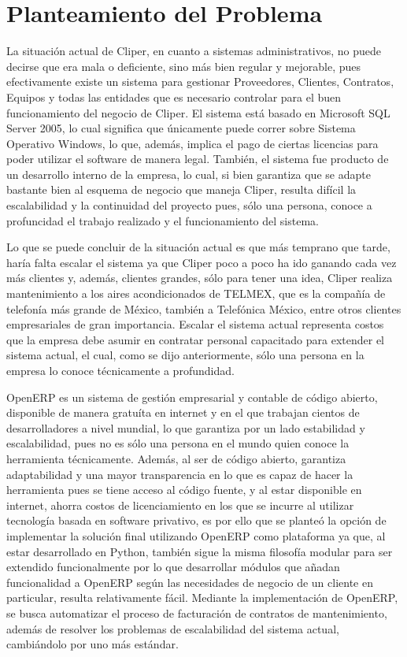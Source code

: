\documentclass[a4paper, 12pt]{article}
\begin{document}
\section{Planteamiento del Problema}
La situación actual de Cliper, en cuanto a sistemas administrativos, no puede decirse que era mala o deficiente, sino más bien regular y mejorable, pues efectivamente existe un sistema para gestionar Proveedores, Clientes, Contratos, Equipos y todas las entidades que es necesario controlar para el buen funcionamiento del negocio de Cliper. El sistema está basado en Microsoft SQL Server 2005, lo cual significa que únicamente puede correr sobre Sistema Operativo Windows, lo que, además, implica el pago de ciertas licencias para poder utilizar el software de manera legal. También, el sistema fue producto de un desarrollo interno de la empresa, lo cual, si bien garantiza que se adapte bastante bien al esquema de negocio que maneja Cliper, resulta difícil la escalabilidad y la continuidad del proyecto pues, sólo una persona, conoce a profuncidad el trabajo realizado y el funcionamiento del sistema.

Lo que se puede concluir de la situación actual es que más temprano que tarde, haría falta escalar el sistema ya que Cliper poco a poco ha ido ganando cada vez más clientes y, además, clientes grandes, sólo para tener una idea, Cliper realiza mantenimiento a los aires acondicionados de TELMEX, que es la compañía de telefonía más grande de México, también a Telefónica México, entre otros clientes empresariales de gran importancia. Escalar el sistema actual representa costos que la empresa debe asumir en contratar personal capacitado para extender el sistema actual, el cual, como se dijo anteriormente, sólo una persona en la empresa lo conoce técnicamente a profundidad. 

OpenERP es un sistema de gestión empresarial y contable de código abierto, disponible de manera gratuíta en internet y en el que trabajan cientos de desarrolladores a nivel mundial, lo que garantiza por un lado estabilidad y escalabilidad, pues no es sólo una persona en el mundo quien conoce la herramienta técnicamente. Además, al ser de código abierto, garantiza adaptabilidad y una mayor transparencia en lo que es capaz de hacer la herramienta pues se tiene acceso al código fuente, y al estar disponible en internet, ahorra costos de licenciamiento en los que se incurre al utilizar tecnología basada en software privativo, es por ello que se planteó la opción de implementar la solución final utilizando OpenERP como plataforma ya que, al estar desarrollado en Python, también sigue la misma filosofía modular para ser extendido funcionalmente por lo que desarrollar módulos que añadan funcionalidad a OpenERP según las necesidades de negocio de un cliente en particular, resulta relativamente fácil. Mediante la implementación de OpenERP, se busca automatizar el proceso de facturación de contratos de mantenimiento, además de resolver los problemas de escalabilidad del sistema actual, cambiándolo por uno más estándar.
\end{document}
